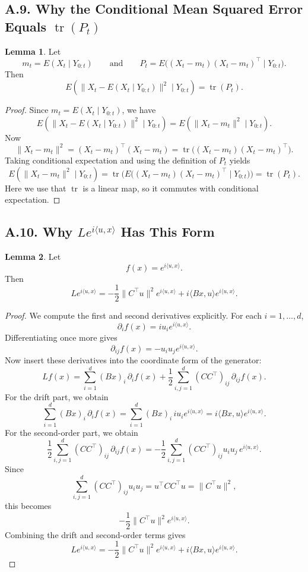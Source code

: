 \documentclass[11pt]{article}
\theoremstyle{definition}
\newtheorem{lemma}{Lemma}
\theoremstyle{remark}
\begin{document}
\subsection*{A.9. Why the Conditional Mean Squared Error Equals $\operatorname{tr}(P_t)$}
\begin{lemma}
Let
\[
m_t=E(X_t\mid Y_{0:t})
\qquad\text{and}\qquad
P_t=E\bigl((X_t-m_t)(X_t-m_t)^\top\mid Y_{0:t}\bigr).
\]
Then
\[
E(\|X_t-E(X_t\mid Y_{0:t})\|^2\mid Y_{0:t})=\operatorname{tr}(P_t).
\]
\end{lemma}

\begin{proof}
Since $m_t=E(X_t\mid Y_{0:t})$, we have
\[
E(\|X_t-E(X_t\mid Y_{0:t})\|^2\mid Y_{0:t})
=E(\|X_t-m_t\|^2\mid Y_{0:t}).
\]
Now
\[
\|X_t-m_t\|^2=(X_t-m_t)^\top(X_t-m_t)
=\operatorname{tr}\bigl((X_t-m_t)(X_t-m_t)^\top\bigr).
\]
Taking conditional expectation and using the definition of $P_t$ yields
\[
E(\|X_t-m_t\|^2\mid Y_{0:t})
=\operatorname{tr}\Big(E\bigl((X_t-m_t)(X_t-m_t)^\top\mid Y_{0:t}\bigr)\Big)
=\operatorname{tr}(P_t).
\]
Here we use that $\operatorname{tr}$ is a linear map, so it commutes with conditional expectation.
\end{proof}

\subsection*{A.10. Why $L e^{i\langle u,x\rangle}$ Has This Form}
\begin{lemma}
Let
\[
f(x)=e^{i\langle u,x\rangle}.
\]
Then
\[
Le^{i\langle u,x\rangle}
=-\frac12\|C^\top u\|^2 e^{i\langle u,x\rangle}
+i\langle Bx,u\rangle e^{i\langle u,x\rangle}.
\]
\end{lemma}

\begin{proof}
We compute the first and second derivatives explicitly. For each $i=1,\dots,d$,
\[
\partial_i f(x)=iu_i e^{i\langle u,x\rangle}.
\]
Differentiating once more gives
\[
\partial_{ij}f(x)=-u_i u_j e^{i\langle u,x\rangle}.
\]
Now insert these derivatives into the coordinate form of the generator:
\[
Lf(x)=\sum_{i=1}^d (Bx)_i\,\partial_i f(x)+\frac12\sum_{i,j=1}^d (CC^\top)_{ij}\,\partial_{ij}f(x).
\]
For the drift part, we obtain
\[
\sum_{i=1}^d (Bx)_i\,\partial_i f(x)
=\sum_{i=1}^d (Bx)_i\,iu_i e^{i\langle u,x\rangle}
=i\langle Bx,u\rangle e^{i\langle u,x\rangle}.
\]
For the second-order part, we obtain
\[
\frac12\sum_{i,j=1}^d (CC^\top)_{ij}\,\partial_{ij}f(x)
=-\frac12\sum_{i,j=1}^d (CC^\top)_{ij}u_i u_j\, e^{i\langle u,x\rangle}.
\]
Since
\[
\sum_{i,j=1}^d (CC^\top)_{ij}u_i u_j
=u^\top CC^\top u
=\|C^\top u\|^2,
\]
this becomes
\[
-\frac12\|C^\top u\|^2 e^{i\langle u,x\rangle}.
\]
Combining the drift and second-order terms gives
\[
Le^{i\langle u,x\rangle}
=-\frac12\|C^\top u\|^2 e^{i\langle u,x\rangle}
+i\langle Bx,u\rangle e^{i\langle u,x\rangle}.
\]
\end{proof}
\end{document}

